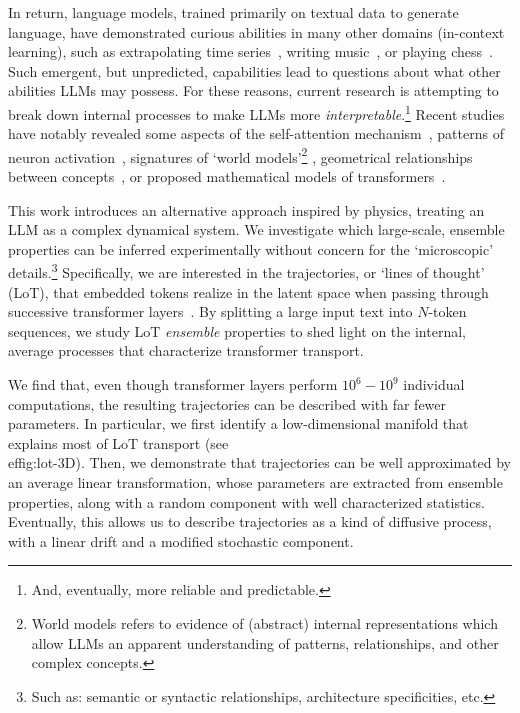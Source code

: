 \documentclass{article} %
\newcommand{\nb}[1]{{\color{teal} NB: #1}} %
\begin{document}
In return, language models, trained primarily on textual data to generate language, have demonstrated curious abilities in many other domains (in-context learning), such as extrapolating time series~\citep{gruver2024largelanguagemodelszeroshot,liu2024llmslearngoverningprinciples}, writing music~\citep{zhou2024llmsreasonmusicevaluation}, or playing chess~\citep{ruoss2024grandmasterlevelchesssearch}. 
Such emergent, but unpredicted, capabilities lead to questions about what other abilities LLMs may possess.
For these reasons, current research is attempting to break down internal processes to make LLMs more \textit{interpretable}.\footnote{And, eventually, more reliable and predictable.}
Recent studies have notably revealed some aspects of the self-attention mechanism~\citep{vig2019visualizingattentiontransformerbasedlanguage}, patterns of neuron activation~\citep{bricken2023monosemanticity,templeton2024scaling}, signatures of `world models'\footnote{
World models refers to evidence of (abstract) internal representations which allow LLMs an apparent understanding of patterns, relationships, and other complex concepts.
}
\citep{gurnee2024languagemodelsrepresentspace,marks2024geometrytruthemergentlinear}, 
geometrical relationships between concepts~\citep{jiang2024originslinearrepresentationslarge}, or proposed mathematical models of transformers~\citep{geshkovski2024emergenceclustersselfattentiondynamics}. 

This work introduces an alternative approach inspired by physics, treating an LLM as a complex dynamical system.
We investigate which large-scale, ensemble properties can be inferred experimentally without concern for the `microscopic' details.\footnote{Such as: semantic or syntactic relationships, architecture specificities, etc.} Specifically, we are interested in the trajectories, or `lines of thought' (LoT), that embedded tokens realize in the latent space when passing through successive transformer layers~\citep{aubry2024transformeralignmentlargelanguage}. 
By splitting a large input text into $N$-token sequences, we study LoT \textit{ensemble} properties to shed light on the internal, average processes that characterize transformer transport.

We find that, even though transformer layers perform $10^6 - 10^9$ individual computations, the resulting trajectories can be described with far fewer parameters.
In particular, we first identify a low-dimensional manifold that explains most of LoT transport (see \\ef{fig:lot-3D}).
Then, we demonstrate that trajectories can be well approximated by an average linear transformation, whose parameters are extracted from ensemble properties, along with a random component with well characterized statistics.
Eventually, this allows us to describe trajectories as a kind of diffusive process, with a linear drift and a modified stochastic component.
\end{document}
